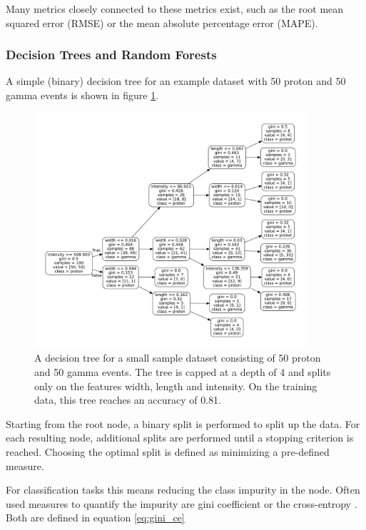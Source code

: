 Many metrics closely connected to these metrics exist, such as the root mean squared error (RMSE)
or the mean absolute percentage error (MAPE).

\subsubsection{Decision Trees and Random Forests}
A simple (binary) decision tree
for an example dataset with 50 proton and 50 gamma
events is shown in figure \ref{fig:03_tree}.

\begin{figure}
  \centering
  \captionsetup{width=0.9\linewidth}
  \includegraphics[width=0.9\textwidth]{Plots/decision_tree.pdf}
  \caption{A decision tree for a small sample dataset consisting of 50 proton and
  50 gamma events. The tree is capped at a depth of 4 and splits only on the 
  features width, length and intensity. On the training data, this tree reaches an
  accuracy of \num{0.81}.}
  \label{fig:03_tree}
\end{figure}

Starting from the root node, a binary split is performed to
split up the data. For each resulting node, additional splits are performed
until a stopping criterion is reached.
Choosing the optimal split is defined as minimizing a
pre-defined measure.

For classification tasks this means reducing the class impurity in the node.
Often used measures
to quantify the impurity are gini coefficient or the
cross-entropy \cite{hastie2017springer}.
Both are defined in equation \ref{eq:gini_ce}

